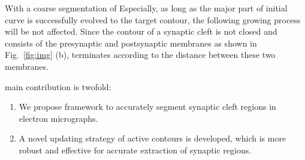 With a coarse segmentation of 
%
Especially, as long as the major part of initial curve is successfully evolved to the target contour, the following growing process will be not affected.
%
Since the contour of a synaptic cleft is not closed and consists of the presynaptic and postsynaptic membranes as shown in Fig.~\ref{fig:img} (b),   terminates according to the distance between these two membranes.


 main contribution is twofold:
\begin{enumerate}
	\item We propose  framework to accurately segment synaptic cleft regions in electron micrographs.
	\item A novel updating strategy of active contours is developed, which is more robust and effective for accurate extraction of synaptic regions.
\end{enumerate}
